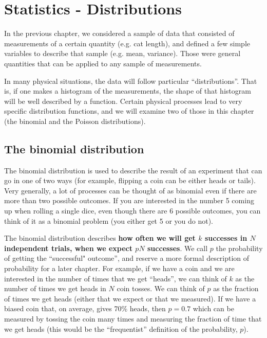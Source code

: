 
%
\chapter{Statistics - Distributions}
\label{chap:StatsDistributions}
In the previous chapter, we considered a sample of data that consisted of measurements of a certain quantity (e.g. cat length), and defined a few simple variables to describe that sample (e.g. mean, variance). Those were general quantities that can be applied to any sample of measurements.

In many physical situations, the data will follow particular ``distributions''. That is, if one makes a histogram of the measurements, the shape of that histogram will be well described by a function. Certain physical processes lead to very specific distribution functions, and we will examine two of those in this chapter (the binomial and the Poisson distributions).

\section{The binomial distribution}

The binomial distribution is used to describe the result of an experiment that can go in one of two ways (for example, flipping a coin can be either heads or tails). Very generally, a lot of processes can be thought of as binomial even if there are more than two possible outcomes. If you are interested in the number 5 coming up when rolling a single dice, even though there are 6 possible outcomes, you can think of it as a binomial problem (you either get 5 or you do not).

The binomial distribution describes \textbf{how often we will get $k$ successes in $N$ independent trials, when we expect $pN$ successes}. We call $p$ the probability of getting the ``successful" outcome'', and reserve a more formal description of probability for a later chapter. For example, if we have a coin and we are interested in the number of times that we get ``heads'', we can think of $k$ as the number of times we get heads in $N$ coin tosses. We can think of $p$ as the fraction of times we get heads (either that we expect or that we measured). If we have a biased coin that, on average, gives 70\% heads, then $p=0.7$ which can be measured by tossing the coin many times and measuring the fraction of time that we get heads (this would be the ``frequentist'' definition of the probability, $p$). 
\newpage

